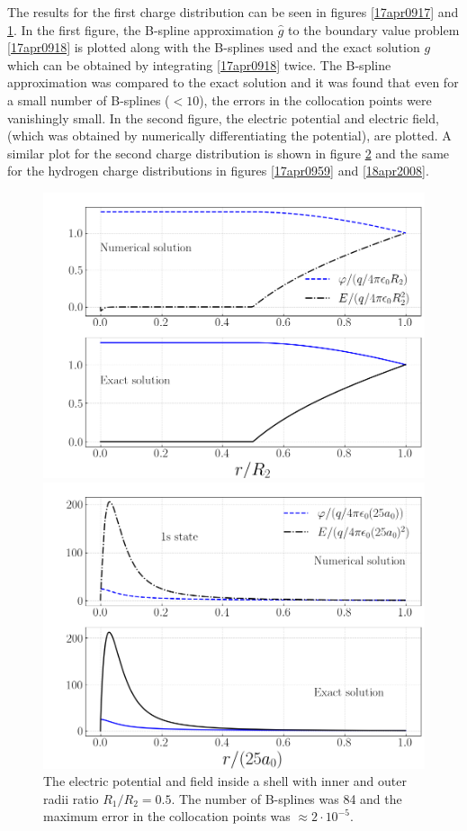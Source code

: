 \documentclass[twocolumn]{article}
\begin{document}
\begin{large}
\begin{figure}[b!]
    \label{17apr0937}
\end{figure}
The results for the first charge distribution can be seen in figures \ref{17apr0917} and \ref{17apr0937}. In the first figure, the B-spline approximation $\hat{g}$ to the boundary value problem \eqref{17apr0918} is plotted along with the B-splines used and the exact solution $g$ which can be obtained by integrating \eqref{17apr0918} twice. The B-spline approximation was compared to the exact solution and it was found that even for a small number of B-splines ($<10$), the errors in the collocation points were vanishingly small. In the second figure, the electric potential and electric field, (which was obtained by numerically differentiating the potential), are plotted. A similar plot for the second charge distribution is shown in figure \ref{17apr0950} and the same for the hydrogen charge distributions in figures \ref{17apr0959} and \ref{18apr2008}. 
\begin{figure}[b!]
    \includegraphics[scale=0.35]{shell_ephi.png}
    \caption{The electric potential and field inside a shell with inner and outer radii ratio $R_1/R_2=0.5$. The number of B-splines was 84 and the maximum error in the collocation points was $\approx 2\cdot 10^{-5}$.}
    \label{17apr0950}
    \includegraphics[scale=0.35]{hydrogen_ephi.png}

\end{figure}
\end{large}
\end{document}
